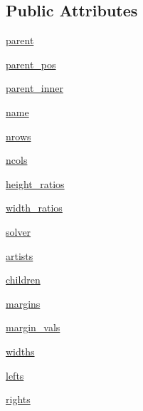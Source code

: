 \subsection*{Public Attributes}
\begin{DoxyCompactItemize}
\item 
\hyperlink{classmatplotlib_1_1__layoutgrid_1_1LayoutGrid_a0149a9bc4e90d35e33b2926f9a41d111}{parent}
\item 
\hyperlink{classmatplotlib_1_1__layoutgrid_1_1LayoutGrid_abcd69b762a3871f5b06ac32640ce8078}{parent\+\_\+pos}
\item 
\hyperlink{classmatplotlib_1_1__layoutgrid_1_1LayoutGrid_adb87f365daeae1a7ab45174d08cc47b7}{parent\+\_\+inner}
\item 
\hyperlink{classmatplotlib_1_1__layoutgrid_1_1LayoutGrid_aff56a1cc7902666363423be6662a3618}{name}
\item 
\hyperlink{classmatplotlib_1_1__layoutgrid_1_1LayoutGrid_a882d6dbe5ed6085da1625f80992e0b98}{nrows}
\item 
\hyperlink{classmatplotlib_1_1__layoutgrid_1_1LayoutGrid_a2bcf4de8e1b1319a5b0e2b5df54ce5e4}{ncols}
\item 
\hyperlink{classmatplotlib_1_1__layoutgrid_1_1LayoutGrid_abcc503616194a9545b70bd6de6b54c9f}{height\+\_\+ratios}
\item 
\hyperlink{classmatplotlib_1_1__layoutgrid_1_1LayoutGrid_a2e9321fca59f72d2399769a0d397e05e}{width\+\_\+ratios}
\item 
\hyperlink{classmatplotlib_1_1__layoutgrid_1_1LayoutGrid_a90b3d214e4e61ffff7edafa987e6532e}{solver}
\item 
\hyperlink{classmatplotlib_1_1__layoutgrid_1_1LayoutGrid_a019f6a7d6cdb920dd9b7f16341a09553}{artists}
\item 
\hyperlink{classmatplotlib_1_1__layoutgrid_1_1LayoutGrid_a2c54bf26d51d1b2cd44878845e9c02af}{children}
\item 
\hyperlink{classmatplotlib_1_1__layoutgrid_1_1LayoutGrid_aefa97d751e716baf3c438e715c67b4a2}{margins}
\item 
\hyperlink{classmatplotlib_1_1__layoutgrid_1_1LayoutGrid_a2a728aef596b9158e149e78bf8d196ff}{margin\+\_\+vals}
\item 
\hyperlink{classmatplotlib_1_1__layoutgrid_1_1LayoutGrid_a0dd8e5aa236c4f907c5c4eef34eef116}{widths}
\item 
\hyperlink{classmatplotlib_1_1__layoutgrid_1_1LayoutGrid_a5d55fb7e814f5e5eb1b56f840f84d827}{lefts}
\item 
\hyperlink{classmatplotlib_1_1__layoutgrid_1_1LayoutGrid_aa93454105df7c4c484855b2f6c038f98}{rights}

\end{DoxyCompactItemize}
